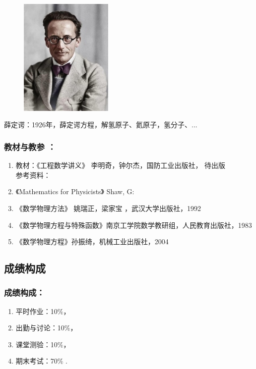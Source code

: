 \begin{frame}
	\frametitle{}
	\begin{center}
		\begin{figure}
			\includegraphics[width=4.5cm]{figs/fig1-3-9.png}	
		\end{figure}
	\end{center}
	{薛定谔：1926年，薛定谔方程，解氢原子、氦原子，氢分子、... }
\end{frame}
\begin{frame}
	\frametitle{教材与教参 ：}
	\begin{enumerate}
		\item 教材：《工程数学讲义》 李明奇，钟尔杰，国防工业出版社， 待出版\\	\vspace{0.3cm}
     	参考资料：\\
		\item 《Mathematics for Physicists》 Shaw, G:
		\vspace{0.3cm}
		\item 《数学物理方法》 姚瑞正，梁家宝 ，武汉大学出版社，1992 
		\vspace{0.3cm}
		\item 《数学物理方程与特殊函数》南京工学院数学教研组，人民教育出版社，1983
		\vspace{0.3cm}
		\item 《数学物理方程》孙振绮，机械工业出版社，2004
	\end{enumerate}	
\end{frame}

\subsection{成绩构成}
\begin{frame}
	\frametitle{成绩构成：}
		\begin{enumerate}
		\item 平时作业：10\%，
		\vspace{0.8cm}
		\item 出勤与讨论：10\%，
		\vspace{0.8cm}
		\item 课堂测验：10\%，
		\vspace{0.8cm}
		\item 期末考试：70\% .
		\end{enumerate}	
\end{frame}

